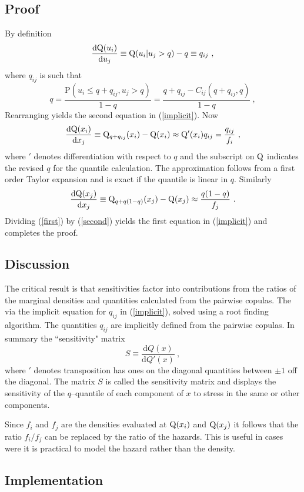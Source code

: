 \documentclass[authoryear]{elsarticle}
\newcommand{\de}{\mathrm{d}}
\newcommand{\eref}[1]{(\ref{#1})}
\renewcommand{\P}{\mathrm{P}}
\newcommand{\be}[1]{\begin{equation}\label{#1}}
\newcommand{\ee}{\end{equation}}
\begin{document}
\subsection{Proof}

By definition
$$
\frac{\de\q(u_i)}{\de u_j} \equiv \q(u_i|u_j>q) -q \equiv q_{ij}\ ,
$$
where  $q_{ij}$ is such that
\be{Qdef}
q =  \frac{\P(u_i\le  q+q_{ij},u_j>q)}{1-q}  = \frac{ q+q_{ij}-C_{ij}(q+q_{ij},q)}{1-q}\ ,
\ee
Rearranging yields the second equation in \eref{implicit}.
Now
 \be{first}
 \frac{\de\q(x_i)}{\de x_j}\equiv \q_{q+q_{ij}}(x_i) - \q(x_i) \approx \q'(x_i)q_{ij}= \frac{q_{ij}}{f_i} \ ,
 \ee
where $'$ denotes differentiation with respect to $q$ and the subscript on $\mathrm{Q}$ indicates the revised $q$ for the quantile calculation.  The approximation follows from a first order Taylor expansion and is exact if the quantile is linear in $q$.   Similarly
 \be{second}
 \frac{\de\q(x_j)}{\de x_j}\equiv  \q_{q+q(1-q)}(x_j) - \q(x_j)\approx \frac{q(1-q)}{f_j}\ .
 \ee
 Dividing \eref{first} by \eref{second} yields the first equation in  \eref{implicit} and completes the proof.

\subsection{Discussion}  The critical  result is that sensitivities factor into contributions from the ratios of the marginal densities and quantities calculated from the pairwise copulas.  The via  the implicit  equation for $q_{ij}$ in \eref{implicit}, solved using a  root finding algorithm.
  The quantities $q_{ij}$ are implicitly defined from the pairwise copulas. In summary the ``sensitivity" matrix 
$$
S \equiv \frac{\de Q(x)}{\de Q'(x)}\ ,
$$
where $'$ denotes transposition has ones on the diagonal quantities between $\pm 1$ off the diagonal.   The matrix $S$ is called the sensitivity matrix and displays the sensitivity of the $q$--quantile of  each component of $x$ to  stress in the same or other components.  

Since $f_i$ and $f_j$ are  the densities evaluated at $\mathrm{Q}(x_i)$ and $\mathrm{Q}(x_j)$  it follows that the ratio $f_i/f_j$ can be replaced by the ratio of the hazards.   This is  useful in cases were it is practical to model the hazard rather than the density.


\subsection{Implementation}
\end{document}
